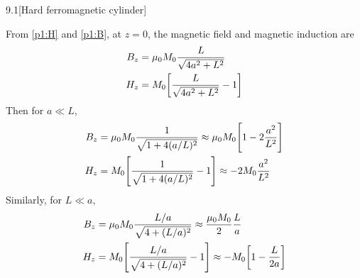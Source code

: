 \documentclass[12pt]{article}
\begin{document}
\begin{problem}{9.1}[Hard ferromagnetic cylinder]
\begin{solution}
From \eqref{p1:H} and \eqref{p1:B}, at $z=0$, the magnetic field and magnetic
induction are
\begin{subequations}
    \begin{align}
        B_z&=\mu_0M_0\frac{L}{\sqrt{4a^2+L^2}}\\
        H_z&=M_0\qty[\frac{L}{\sqrt{4a^2+L^2}}-1]
    \end{align} 
\end{subequations}
Then for $a\ll L$,
\begin{subequations}
    \begin{align}
        B_z&=\mu_0M_0\frac{1}{\sqrt{1+4(a/L)^2}}\approx\mu_0M_0\qty[1-2\frac{a^2}{L^2}]\\
        H_z&=M_0\qty[\frac{1}{\sqrt{1+4(a/L)^2}}-1]
        \approx-2M_0\frac{a^2}{L^2}
    \end{align} 
\end{subequations}
Similarly, for $L\ll a$,
\begin{subequations}
    \begin{align}
        B_z&=\mu_0M_0\frac{L/a}{\sqrt{4+(L/a)^2}}\approx\frac{\mu_0M_0}{2}\frac{L}{a}\\
        H_z&=M_0\qty[\frac{L/a}{\sqrt{4+(L/a)^2}}-1]
        \approx -M_0\qty[1-\frac{L}{2a}]
    \end{align} 
\end{subequations}
\end{solution}
\end{problem}
\end{document}
